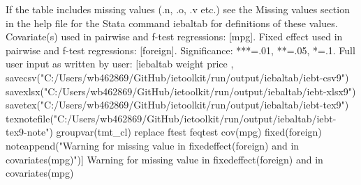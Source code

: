 If the table includes missing values (.n, .o, .v etc.) see the Missing values section in the help file for the Stata command iebaltab for definitions of these values. Covariate(s) used in pairwise and f-test regressions: [mpg]. Fixed effect used in pairwise and f-test regressions: [foreign]. Significance: ***=.01, **=.05, *=.1. Full user input as written by user: [iebaltab weight price , savecsv("C:/Users/wb462869/GitHub/ietoolkit/run/output/iebaltab/iebt-csv9") savexlsx("C:/Users/wb462869/GitHub/ietoolkit/run/output/iebaltab/iebt-xlsx9") savetex("C:/Users/wb462869/GitHub/ietoolkit/run/output/iebaltab/iebt-tex9") texnotefile("C:/Users/wb462869/GitHub/ietoolkit/run/output/iebaltab/iebt-tex9-note") groupvar(tmt\_cl) replace ftest feqtest cov(mpg) fixed(foreign) noteappend("Warning for missing value in fixedeffect(foreign) and in covariates(mpg)")] Warning for missing value in fixedeffect(foreign) and in covariates(mpg)
